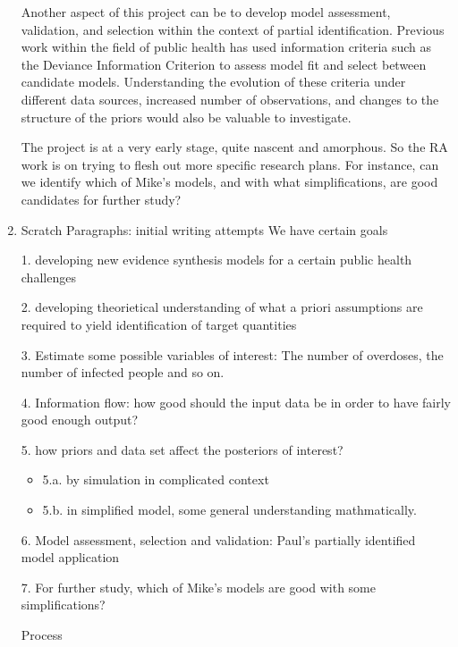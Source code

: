 \documentclass[
10pt, %
a4paper, %
oneside, %
headinclude,footinclude, %
BCOR5mm, %
]{scrartcl}
\begin{document}
\begin{enumerate}
	Another aspect of this project can be to develop model assessment, validation, and selection within the context of partial identification. Previous work within the field of public health has used information criteria such as the Deviance Information Criterion to assess model fit and select between candidate models. Understanding the evolution of these criteria under different data sources, increased number of observations, and changes to the structure of the priors would also be valuable to investigate.
	
	The project is at a very early stage, quite nascent and amorphous. So the RA work is on trying to flesh out more specific research plans. For instance, can we identify which of Mike's models, and with what simplifications, are good candidates for further study?
	
	\item{Scratch Paragraphs: initial writing attempts}
	We have certain goals 
	
	1. developing new evidence synthesis models for a certain public health challenges
	
	2. developing theorietical understanding of what a priori assumptions are required to yield identification of target quantities 
	
	3. Estimate some possible variables of interest:
	The number of overdoses, the number of infected people and so on.
	
	4. Information flow: how good should the input data be in order to have fairly good enough output?
	
	5. how priors and data set affect the posteriors of interest?
	
	\begin{itemize}
		\item 5.a. by simulation in complicated context
		\item  5.b. in simplified model, some general understanding mathmatically.
	\end{itemize}
	
	6. Model assessment, selection and validation:
	Paul's partially identified model application
	
	7. For further study, which of Mike's models are good with some simplifications? 
	
	\LARGE Process
	

\end{enumerate}
\end{document}
